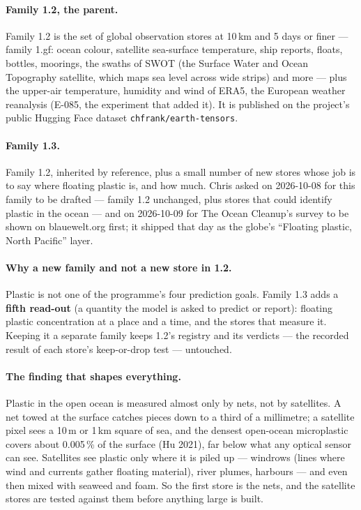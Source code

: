 \documentclass[10pt]{article}
\newcommand{\code}[1]{\texttt{#1}}
\begin{document}
\paragraph{Family 1.2, the parent.} Family 1.2 is the set of global observation stores at 10\,km and 5 days or
finer --- family 1.gf: ocean colour, satellite sea-surface temperature, ship reports, floats, bottles, moorings,
the swaths of SWOT (the Surface Water and Ocean Topography satellite, which maps sea level across wide strips) and
more --- plus the upper-air temperature, humidity and wind of ERA5, the European weather reanalysis (E-085, the
experiment that added it). It is published on the project's public Hugging Face dataset
\code{chfrank/earth-tensors}.

\paragraph{Family 1.3.} Family 1.2, inherited by reference, plus a small number of new stores whose job is to say
where floating plastic is, and how much. Chris asked on 2026-10-08 for this family to be drafted --- family 1.2
unchanged, plus stores that could identify plastic in the ocean --- and on 2026-10-09 for The Ocean Cleanup's
survey to be shown on blauewelt.org first; it shipped that day as the globe's ``Floating plastic, North Pacific''
layer.

\paragraph{Why a new family and not a new store in 1.2.} Plastic is not one of the programme's four prediction
goals. Family 1.3 adds a \textbf{fifth read-out} (a quantity the model is asked to predict or report): floating
plastic concentration at a place and a time, and the stores that measure it. Keeping it a separate family keeps
1.2's registry and its verdicts --- the recorded result of each store's keep-or-drop test --- untouched.

\paragraph{The finding that shapes everything.} Plastic in the open ocean is measured almost only by nets, not by
satellites. A net towed at the surface catches pieces down to a third of a millimetre; a satellite pixel sees a
10\,m or 1\,km square of sea, and the densest open-ocean microplastic covers about 0.005\,\% of the surface
(Hu 2021), far below what any optical sensor can see. Satellites see plastic only where it is piled up ---
windrows (lines where wind and currents gather floating material), river plumes, harbours --- and even then mixed
with seaweed and foam. So the first store is the nets, and the satellite stores are tested against them before
anything large is built.
\end{document}
